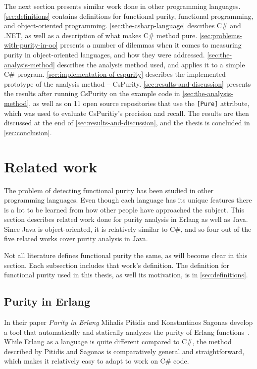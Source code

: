 \documentclass[a4paper,12pt]{article}
\newcommand{\Autoref}[1]{%
  \begingroup%
  \def\chapterautorefname{Chapter}%
  \def\sectionautorefname{Section}%
  \def\subsectionautorefname{Subsection}%
  \def\itemautorefname{Item}%
  \autoref{#1}%
  \endgroup%
}
\begin{document}
 The next section presents similar work done in other programming languages. \Autoref{sec:definitions} contains definitions for functional purity, functional programming, and object-oriented programming. \Autoref{sec:the-csharp-language} describes C\# and .NET, as well as a description of what makes C\# method pure. \Autoref{sec:problems-with-purity-in-oo} presents a number of dilemmas when it comes to measuring purity in object-oriented languages, and how they were addressed. \Autoref{sec:the-analysis-method} describes the analysis method used, and applies it to a simple C\# program. \Autoref{sec:implementation-of-cspurity} describes the implemented prototype of the analysis method -- CsPurity. \Autoref{sec:results-and-discussion} presents the results after running CsPurity on the example code in \autoref{sec:the-analysis-method}, as well as on 11 open source repositories that use the \texttt{[Pure]} attribute, which was used to evaluate CsPuritiy's precision and recall. The results are then discussed at the end of \autoref{sec:results-and-discussion}, and the thesis is concluded in \autoref{sec:conclusion}.

\section{Related work} \label{sec:related-work} %

The problem of detecting functional purity has been studied in other programming languages. Even though each language has its unique features there is a lot to be learned from how other people have approached the subject. This section describes related work done for purity analysis in Erlang as well as Java. Since Java is object-oriented, it is relatively similar to C\#, and so four out of the five related works cover purity analysis in Java.

Not all literature defines functional purity the same, as will become clear in this section. Each subsection includes that work's definition. The definition for functional purity used in this thesis, as well its motivation, is in \autoref{sec:definitions}.

\subsection{Purity in Erlang} \label{sub:Purity-in-Erlang}

In their paper \textit{Purity in Erlang} Mihalis Pitidis and Konstantinos Sagonas develop a tool that automatically and statically analyzes the purity of Erlang functions~\cite{pitidis2010purity}. While Erlang as a language is quite different compared to C\#, the method described by Pitidis and Sagonas is comparatively general and straightforward, which makes it relatively easy to adapt to work on C\# code.
\end{document}
